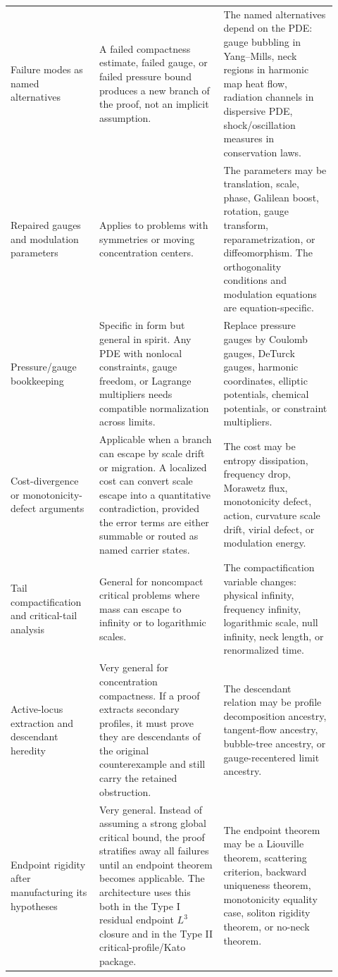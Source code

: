 \documentclass[11pt]{amsart}
\begin{document}
\begin{longtable}{@{}>{\raggedright\arraybackslash}p{0.25\linewidth}>{\raggedright\arraybackslash}p{0.35\linewidth}>{\raggedright\arraybackslash}p{0.32\linewidth}@{}}
Failure modes as named alternatives & A failed compactness estimate, failed gauge, or failed pressure bound produces a new branch of the proof, not an implicit assumption. & The named alternatives depend on the PDE: gauge bubbling in Yang--Mills, neck regions in harmonic map heat flow, radiation channels in dispersive PDE, shock/oscillation measures in conservation laws. \\
Repaired gauges and modulation parameters & Applies to problems with symmetries or moving concentration centers. & The parameters may be translation, scale, phase, Galilean boost, rotation, gauge transform, reparametrization, or diffeomorphism.  The orthogonality conditions and modulation equations are equation-specific. \\
Pressure/gauge bookkeeping & Specific in form but general in spirit.  Any PDE with nonlocal constraints, gauge freedom, or Lagrange multipliers needs compatible normalization across limits. & Replace pressure gauges by Coulomb gauges, DeTurck gauges, harmonic coordinates, elliptic potentials, chemical potentials, or constraint multipliers. \\
Cost-divergence or monotonicity-defect arguments & Applicable when a branch can escape by scale drift or migration.  A localized cost can convert scale escape into a quantitative contradiction, provided the error terms are either summable or routed as named carrier states. & The cost may be entropy dissipation, frequency drop, Morawetz flux, monotonicity defect, action, curvature scale drift, virial defect, or modulation energy. \\
Tail compactification and critical-tail analysis & General for noncompact critical problems where mass can escape to infinity or to logarithmic scales. & The compactification variable changes: physical infinity, frequency infinity, logarithmic scale, null infinity, neck length, or renormalized time. \\
Active-locus extraction and descendant heredity & Very general for concentration compactness.  If a proof extracts secondary profiles, it must prove they are descendants of the original counterexample and still carry the retained obstruction. & The descendant relation may be profile decomposition ancestry, tangent-flow ancestry, bubble-tree ancestry, or gauge-recentered limit ancestry. \\
Endpoint rigidity after manufacturing its hypotheses & Very general.  Instead of assuming a strong global critical bound, the proof stratifies away all failures until an endpoint theorem becomes applicable.  The architecture uses this both in the Type I residual endpoint \(L^3\) closure and in the Type II critical-profile/Kato package. & The endpoint theorem may be a Liouville theorem, scattering criterion, backward uniqueness theorem, monotonicity equality case, soliton rigidity theorem, or no-neck theorem. \\

\end{longtable}
\end{document}
